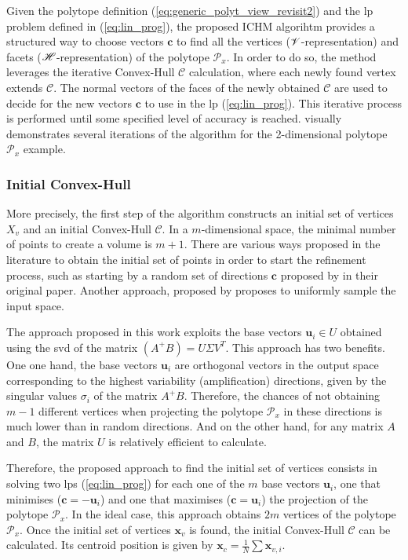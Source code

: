 Given the polytope definition (\ref{eq:generic_polyt_view_revisit2}) and the \gls{lp} problem defined in (\ref{eq:lin_prog}), the proposed ICHM algorihtm provides a structured way to choose vectors $\bm{c}$ to find all the vertices ($\mathscr{V}$-representation) and facets ($\mathscr{H}$-representation) of the polytope $\mathcal{P}_x$. 
In order to do so, the method leverages the iterative Convex-Hull $\mathcal{C}$ calculation, where each newly found vertex extends $\mathcal{C}$. The normal vectors of the faces of the newly obtained $\mathcal{C}$ are used to decide for the new vectors $\bm{c}$ to use in the \gls{lp} (\ref{eq:lin_prog}). This iterative process is performed until some specified level of accuracy is reached.  visually demonstrates several iterations of the algorithm for the 2-dimensional polytope $\mathcal{P}_x$ example.

\subsubsection{Initial Convex-Hull}More precisely, the first step of the algorithm constructs an initial set of vertices $X_v$ and an initial Convex-Hull $\mathcal{C}$. In a $m$-dimensional space, the minimal number of points to create a volume is $m\!+\!1$.  There are various ways proposed in the literature to obtain the initial set of points in order to start the refinement process, such as starting by a random set of directions $\bm{c}$ proposed by \citet{lassez1992quantifier} in their original paper. Another approach, proposed by \citet{DelPrete2016Fast} proposes to uniformly sample the input space.

The approach proposed in this work exploits the base vectors $\bm{u}_i\in U$ obtained using the \gls{svd} of the matrix $(A^+B) = U\Sigma V^T$. This approach has two benefits. One one hand, the base vectors $\bm{u}_i$ are orthogonal vectors in the output space corresponding to the 
highest variability (amplification) directions, given by the singular values $\sigma_i$ of the matrix $A^+B$.
Therefore, the chances of not obtaining $m-1$ different vertices when projecting the polytope $\mathcal{P}_x$ in these directions is much lower than in random directions. And on the other hand, for any matrix $A$ and $B$, the matrix $U$ is relatively efficient to calculate.

Therefore, the proposed approach to find the initial set of vertices consists in solving two \glspl{lp} (\ref{eq:lin_prog}) for each one of the $m$ base vectors $\bm{u}_i$, one that minimises ($\bm{c} = -\bm{u}_i$) and one that maximises ($\bm{c} = \bm{u}_i$) the projection of the polytope $\mathcal{P}_x$. In the ideal case, this approach obtains $2m$ vertices of the polytope $\mathcal{P}_x$. Once the initial set of vertices $\bm{x}_v$ is found, the initial Convex-Hull $\mathcal{C}$ can be calculated. Its centroid position is given by $\bm{x}_c\!=\!\frac{1}{N}\!\sum\bm{x}_{v,i}$. 



